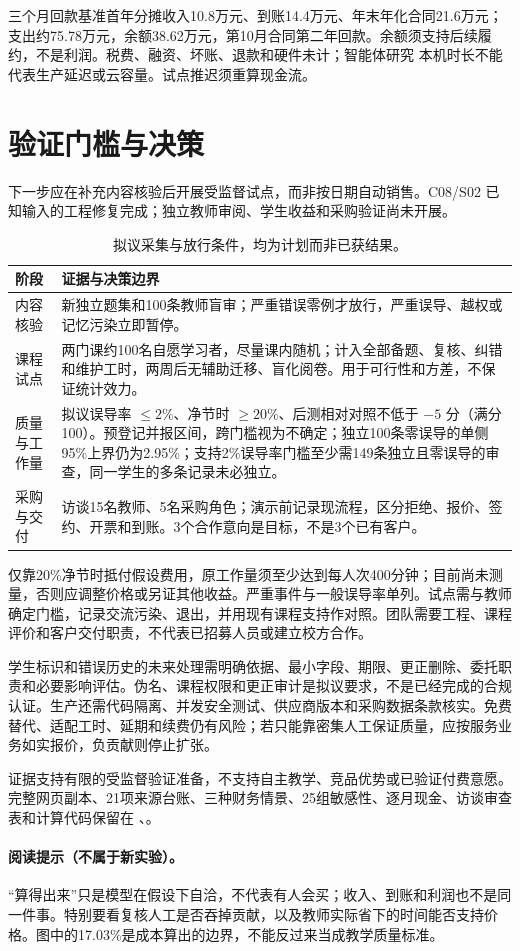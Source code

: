 三个月回款基准首年分摊收入10.8万元、到账14.4万元、年末年化合同21.6万元；支出约75.78万元，余额38.62万元，第10月合同第二年回款。余额须支持后续履约，不是利润。税费、融资、坏账、退款和硬件未计；智能体研究 本机时长不能代表生产延迟或云容量。试点推迟须重算现金流。

\section{验证门槛与决策}
下一步应在补充内容核验后开展受监督试点，而非按日期自动销售。C08/S02 已知输入的工程修复完成；独立教师审阅、学生收益和采购验证尚未开展。

\begin{table}[htbp]\centering\small
\caption{拟议采集与放行条件，均为计划而非已获结果。}\label{tab:concise-business-gates}
\begin{tabularx}{\linewidth}{@{}p{29mm}Y@{}}\toprule
阶段 & 证据与决策边界\\\midrule
内容核验 & 新独立题集和100条教师盲审；严重错误零例才放行，严重误导、越权或记忆污染立即暂停。\\
课程试点 & 两门课约100名自愿学习者，尽量课内随机；计入全部备题、复核、纠错和维护工时，两周后无辅助迁移、盲化阅卷。用于可行性和方差，不保证统计效力。\\
质量与工作量 & 拟议误导率 $\leq2\%$、净节时 $\geq20\%$、后测相对对照不低于 $-5$ 分（满分100）。预登记并报区间，跨门槛视为不确定；独立100条零误导的单侧95\%上界仍为2.95\%；支持2\%误导率门槛至少需149条独立且零误导的审查，同一学生的多条记录未必独立。\\
采购与交付 & 访谈15名教师、5名采购角色；演示前记录现流程，区分拒绝、报价、签约、开票和到账。3个合作意向是目标，不是3个已有客户。\\\bottomrule
\end{tabularx}
\end{table}\FloatBarrier

仅靠20\%净节时抵付假设费用，原工作量须至少达到每人次400分钟；目前尚未测量，否则应调整价格或另证其他收益。严重事件与一般误导率单列。试点需与教师确定门槛，记录交流污染、退出，并用现有课程支持作对照。团队需要工程、课程评价和客户交付职责，不代表已招募人员或建立校方合作。

学生标识和错误历史的未来处理需明确依据、最小字段、期限、更正删除、委托职责和必要影响评估\cite{businesspipl}。伪名、课程权限和更正审计是拟议要求，不是已经完成的合规认证。生产还需代码隔离、并发安全测试、供应商版本和采购数据条款核实。免费替代、适配工时、延期和续费仍有风险；若只能靠密集人工保证质量，应按服务业务如实报价，负贡献则停止扩张。

证据支持有限的受监督验证准备，不支持自主教学、竞品优势或已验证付费意愿。完整网页副本、21项来源台账、三种财务情景、25组敏感性、逐月现金、访谈审查表和计算代码保留在 、。

\paragraph{阅读提示（不属于新实验）。}
“算得出来”只是模型在假设下自洽，不代表有人会买；收入、到账和利润也不是同一件事。特别要看复核人工是否吞掉贡献，以及教师实际省下的时间能否支持价格。图中的17.03\%是成本算出的边界，不能反过来当成教学质量标准。
